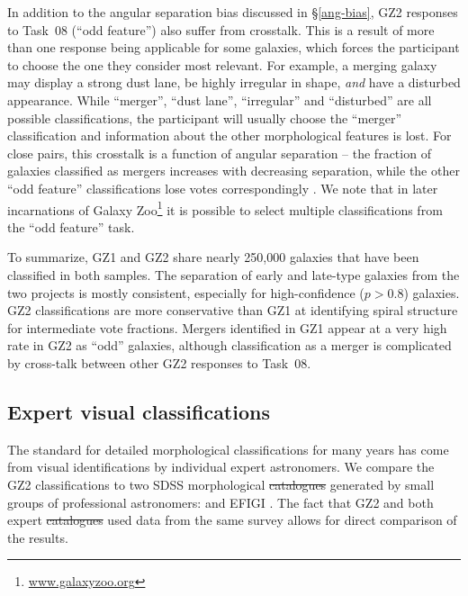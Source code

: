 \documentclass[useAMS,usenatbib]{mn2e}
\providecommand{\DIFaddtex}[1]{{\protect\color{blue}\uwave{#1}}} %
\providecommand{\DIFdeltex}[1]{{\protect\color{red}\sout{#1}}}                      %
\providecommand{\DIFaddbegin}{} %
\providecommand{\DIFaddend}{} %
\providecommand{\DIFdelbegin}{} %
\providecommand{\DIFdelend}{} %
\providecommand{\DIFadd}[1]{\texorpdfstring{\DIFaddtex{#1}}{#1}} %
\providecommand{\DIFdel}[1]{\texorpdfstring{\DIFdeltex{#1}}{}} %
\begin{document}
In addition to the angular separation bias discussed in \S\ref{ang-bias}, GZ2 responses to Task~08 (``odd feature'') also suffer from crosstalk. This is a result of more than one response being applicable for some galaxies, which forces the participant to choose the one they consider most relevant. For example, a merging galaxy may display a strong dust lane, be highly irregular in shape, {\em and} have a disturbed appearance. While ``merger'', ``dust lane'', ``irregular'' and ``disturbed'' are all possible classifications, the participant will usually choose the ``merger'' classification and information about the other morphological features is lost. For close pairs, this crosstalk is a function of angular separation -- the fraction of galaxies classified as mergers increases with decreasing separation, while the other ``odd feature'' classifications lose votes correspondingly \citep{cas13}. We note that in later incarnations of Galaxy Zoo\footnote{\url{www.galaxyzoo.org}} it is possible to select multiple classifications from the ``odd feature'' task.


To summarize, GZ1 and GZ2 share nearly 250,000 galaxies that have been classified in both samples. The separation of early and late-type galaxies from the two projects is mostly consistent, especially for high-confidence ($p>0.8$) galaxies. GZ2 classifications are more conservative than GZ1 at identifying spiral structure for intermediate vote fractions. Mergers identified in GZ1 appear at a very high rate in GZ2 as ``odd'' galaxies, although classification as a merger is complicated by cross-talk between other GZ2 responses to Task~08. 

\subsection{Expert visual classifications}

The standard for detailed morphological classifications for many years has come from visual identifications by individual expert astronomers. We compare the GZ2 classifications to two SDSS morphological \DIFdelbegin \DIFdel{catalogues }\DIFdelend \DIFaddbegin \DIFadd{catalogs }\DIFaddend generated by small groups of professional astronomers: \citet[][hereafter NA10]{nai10} and EFIGI \citep{bai11}. The fact that GZ2 and both expert \DIFdelbegin \DIFdel{catalogues }\DIFdelend \DIFaddbegin \DIFadd{catalogs }\DIFaddend used data from the same survey allows for direct comparison of the results.
\end{document}
